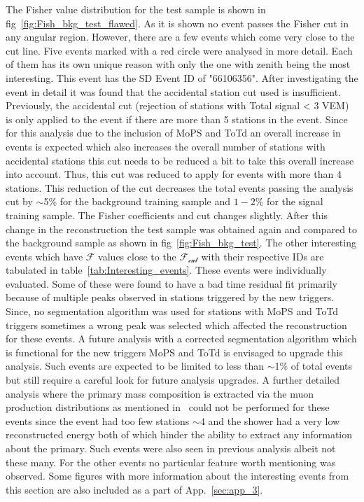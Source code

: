 The Fisher value distribution for the test sample is shown in fig~\ref{fig:Fish_bkg_test_flawed}. As it is shown no event passes the Fisher cut in any angular region. However, there are a few events which come very close to the cut line. Five events marked with a red circle were analysed in more detail. Each of them has its own unique reason with only the one with zenith being the most interesting. This event has the SD Event ID of "66106356". After investigating the event in detail it was found that the accidental station cut used is insufficient. Previously, the  accidental cut (rejection of stations with Total signal < 3 VEM) is only applied to the event if there are more than 5 stations in the event. Since for this analysis due to the inclusion of MoPS and ToTd an overall increase in events is expected which also increases the overall number of stations with accidental stations this cut needs to be reduced a bit to take this overall increase into account. Thus, this cut was reduced to apply for events with more than 4 stations. This reduction of the cut decreases the total events passing the analysis cut by $\sim$5\% for the background training sample and $1-2$\% for the signal training sample. The Fisher coefficients and cut changes slightly. After this change in the reconstruction the test sample was obtained again and compared to the background sample as shown in fig~\ref{fig:Fish_bkg_test}. The other interesting events which have $\mathcal{F}$ values close to the $\mathcal{F_{cut}}$ with their respective IDs are tabulated in table~\ref{tab:Interesting_events}. These events were individually evaluated. Some of these were found to have a bad time residual fit primarily because of multiple peaks observed in stations triggered by the new triggers. Since, no segmentation algorithm was used for stations with MoPS and ToTd triggers sometimes a wrong peak was selected which affected the reconstruction for these events. A future analysis with a corrected segmentation algorithm which is functional for the new triggers MoPS and ToTd is envisaged to upgrade this analysis. Such events are expected to be limited to less than $\sim$1\% of total events but still require a careful look for future analysis upgrades. A further detailed analysis where the primary mass composition is extracted via the muon production distributions as mentioned in~\cite{PierreAuger:2014zay} could not be performed for these events since the event had too few stations $\sim 4$ and the shower had a very low reconstructed energy both of which hinder the ability to extract any information about the primary. Such events were also seen in previous analysis albeit not these many. For the other events no particular feature worth mentioning was observed. Some figures with more information about the interesting events from this section are also included as a part of App.~\ref{sec:app_3}. 

